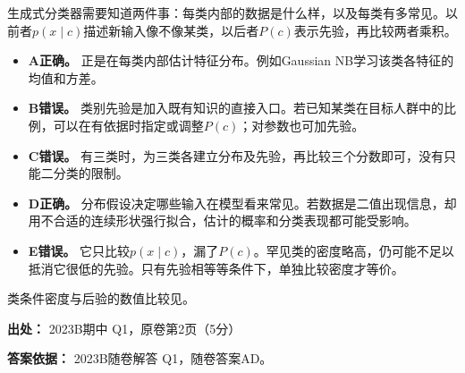 生成式分类器需要知道两件事：每类内部的数据是什么样，以及每类有多常见。以前者\(p(x\mid c)\)描述新输入像不像某类，以后者\(P(c)\)表示先验，再比较两者乘积。



\begin{itemize}

\item \textbf{A正确。} 正是在每类内部估计特征分布。例如Gaussian NB学习该类各特征的均值和方差。

\item \textbf{B错误。} 类别先验是加入既有知识的直接入口。若已知某类在目标人群中的比例，可以在有依据时指定或调整\(P(c)\)；对参数也可加先验。

\item \textbf{C错误。} 有三类时，为三类各建立分布及先验，再比较三个分数即可，没有只能二分类的限制。

\item \textbf{D正确。} 分布假设决定哪些输入在模型看来常见。若数据是二值出现信息，却用不合适的连续形状强行拟合，估计的概率和分类表现都可能受影响。

\item \textbf{E错误。} 它只比较\(p(x\mid c)\)，漏了\(P(c)\)。罕见类的密度略高，仍可能不足以抵消它很低的先验。只有先验相等等条件下，单独比较密度才等价。

\end{itemize}


类条件密度与后验的数值比较见。


\textbf{出处：} 2023B期中 Q1，原卷第2页（5分）


\textbf{答案依据：} 2023B随卷解答 Q1，随卷答案AD。
